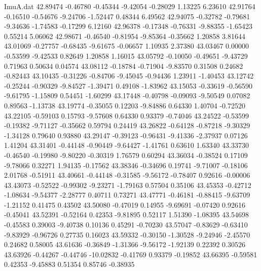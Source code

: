 \begin{filecontents}{ImuA.dat}
  42.89474   -0.46780   -0.45344   -9.42054   -0.28029    1.13225    6.23610
  42.91764   -0.16510   -0.54676   -9.24706   -1.52447    0.48344    6.49562
  42.94075   -0.32782   -0.79681   -9.34636   -1.74583   -0.17299    6.12160
  42.96378   -0.17348   -0.76331   -9.88355   -1.65423    0.55214    5.06062
  42.98671   -0.46540   -0.81954   -9.85364   -0.35662    1.20858    3.81644
  43.01069   -0.27757   -0.68435   -9.61675   -0.06657    1.10935    2.37380
  43.03467    0.00000   -0.53599   -9.42533    0.82649    1.20858    1.16015
  43.05792   -0.10050   -0.49651   -9.43729    0.71963    0.50634    0.04574
  43.08112   -0.18784   -0.71904   -9.83570    0.31508    0.24682   -0.82443
  43.10435   -0.31226   -0.84706   -9.45045   -0.94436    1.23911   -1.40453
  43.12742   -0.25244   -0.90329   -9.84527   -1.39471    0.49108   -1.83962
  43.15053   -0.33619   -0.56590   -9.61795   -1.15809    0.54451   -1.60299
  43.17448   -0.40798   -0.09093   -9.50549    0.07082    0.89563   -1.13738
  43.19774   -0.35055    0.12203   -9.84886    0.64330    1.40704   -0.72520
  43.22105   -0.59103    0.15793   -9.57608    0.64330    0.93379   -0.74046
  43.24522   -0.53599   -0.19382   -9.71127   -0.35662    0.59794    0.24419
  43.26822   -0.64128   -0.87218   -9.30329   -1.34128    0.79640    0.93880
  43.29147   -0.39123   -0.96431   -9.41336   -2.37937    0.07126    1.41204
  43.31401   -0.44148   -0.90449   -9.64427   -1.41761    0.63610    1.63340
  43.33730   -0.46540   -0.19980   -9.80220   -0.30319    1.76579    0.60294
  43.36034   -0.38524    0.17109   -9.78066    0.32271    1.94135   -0.17562
  43.38346   -0.34696    0.19741   -9.71007   -0.18106    2.01768   -0.51911
  43.40661   -0.44148   -0.31585   -9.56172   -0.78407    0.92616   -0.00006
  43.43073   -0.52522   -0.99302   -9.23271   -1.79163    0.57504    0.35106
  43.45353   -0.42712   -1.08634   -9.54377   -2.28777    0.40711    0.73271
  43.47771   -0.46181   -0.88415   -9.63709   -1.21152    0.41475    0.43502
  43.50080   -0.47019    0.14955   -9.69691   -0.07420    0.92616   -0.45041
  43.52391   -0.52164    0.42353   -9.81895    0.52117    1.51390   -1.08395
  43.54698   -0.45583    0.39003   -9.40738    0.10136    0.45291   -0.70230
  43.57047   -0.83629   -0.63410   -9.83929   -0.96726    0.27735    0.16023
  43.59332   -0.30150   -1.30528   -9.24946   -2.45570    0.24682    0.58005
  43.61636   -0.36849   -1.31366   -9.56172   -1.92139    0.22392    0.30526
  43.63926   -0.44267   -0.44746  -10.02832   -0.41769    0.93379   -0.19852
  43.66395   -0.59581    0.42353   -9.45883    0.51354    0.85746   -0.38935

\end{filecontents}
